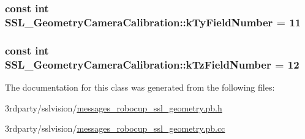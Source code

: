 \hypertarget{class_s_s_l___geometry_camera_calibration_a402d20a908828f10b589face5b9978de}{
\subsubsection[{k\-Ty\-Field\-Number}]{\setlength{\rightskip}{0pt plus 5cm}const int S\-S\-L\-\_\-\-Geometry\-Camera\-Calibration\-::k\-Ty\-Field\-Number = 11\hspace{0.3cm}{\ttfamily [static]}}}\label{class_s_s_l___geometry_camera_calibration_a402d20a908828f10b589face5b9978de}
\hypertarget{class_s_s_l___geometry_camera_calibration_aff281cefbb148fd5cf845b4cf67ba5e1}{
\subsubsection[{k\-Tz\-Field\-Number}]{\setlength{\rightskip}{0pt plus 5cm}const int S\-S\-L\-\_\-\-Geometry\-Camera\-Calibration\-::k\-Tz\-Field\-Number = 12\hspace{0.3cm}{\ttfamily [static]}}}\label{class_s_s_l___geometry_camera_calibration_aff281cefbb148fd5cf845b4cf67ba5e1}


The documentation for this class was generated from the following files\-:\begin{DoxyCompactItemize}
\item 
3rdparty/sslvision/\hyperlink{messages__robocup__ssl__geometry_8pb_8h}{messages\-\_\-robocup\-\_\-ssl\-\_\-geometry.\-pb.\-h}\item 
3rdparty/sslvision/\hyperlink{messages__robocup__ssl__geometry_8pb_8cc}{messages\-\_\-robocup\-\_\-ssl\-\_\-geometry.\-pb.\-cc}\end{DoxyCompactItemize}
